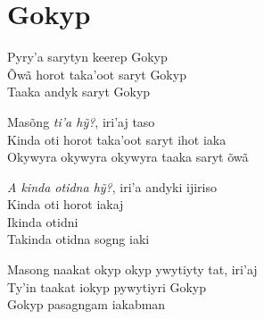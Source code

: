 \chapter*{Gokyp}

\begin{linenumbers}\begingroup\raggedright
\noindent Pyry'a sarytyn keerep Gokyp\\
Õwã horot taka'oot saryt Gokyp\\
Taaka andyk saryt Gokyp
\end{linenumbers}\endgroup

\bigskip

\begin{linenumbers}\begingroup\raggedright
\noindent Masõng \emph{ti'a hỹ?}, iri'aj taso\\
Kinda oti horot taka'oot saryt ihot iaka\\
Okywyra okywyra okywyra taaka saryt õwã
\end{linenumbers}\endgroup

\bigskip
\begin{linenumbers}\begingroup\raggedright

\noindent \emph{A kinda otidna hỹ?}, iri'a andyki ijiriso\\
Kinda oti horot iakaj\\
Ikinda otidni\\
Takinda otidna sogng iaki
\end{linenumbers}\endgroup

\bigskip

\begin{linenumbers}\begingroup\raggedright
\noindent Masong naakat okyp okyp ywytiyty tat, iri'aj\\
Ty'in taakat iokyp pywytiyri Gokyp\\
Gokyp pasagngam iakabman
\end{linenumbers}\endgroup

